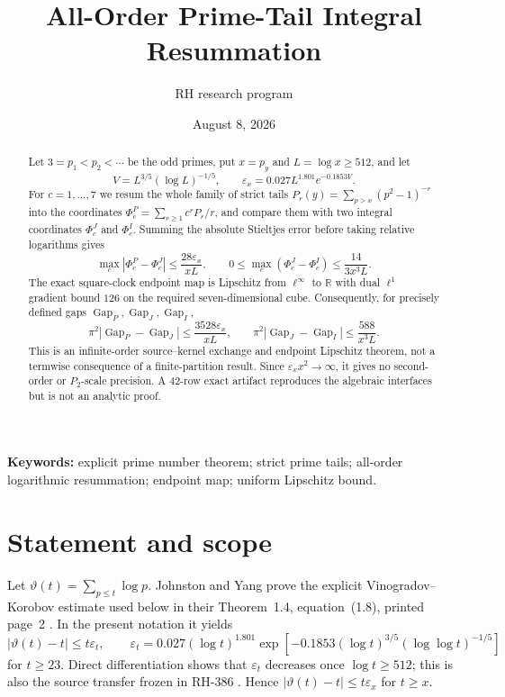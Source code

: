\documentclass[11pt]{article}
\title{All-Order Prime-Tail Integral Resummation}
\author{RH research program}
\date{August 8, 2026}
\theoremstyle{definition}
\theoremstyle{remark}
\newcommand{\eps}{\varepsilon}
\newcommand{\PhiP}{\Phi^{P}}
\newcommand{\PhiJ}{\Phi^{J}}
\newcommand{\PhiI}{\Phi^{I}}
\newcommand{\GapP}{\operatorname{Gap}_{P}}
\newcommand{\GapJ}{\operatorname{Gap}_{J}}
\newcommand{\GapI}{\operatorname{Gap}_{I}}
\begin{document}
\maketitle

\begin{abstract}
Let $3=p_1<p_2<\cdots$ be the odd primes, put $x=p_y$ and
$L=\log x\ge512$, and let
\[
 V=L^{3/5}(\log L)^{-1/5},\qquad
 \eps_x=0.027L^{1.801}e^{-0.1853V}.
\]
For $c=1,\ldots,7$ we resum the whole family of strict tails
$P_r(y)=\sum_{p>x}(p^2-1)^{-r}$ into the coordinates
$\PhiP_c=\sum_{r\ge1}c^rP_r/r$, and compare them with two integral
coordinates $\PhiJ_c$ and $\PhiI_c$.  Summing the absolute Stieltjes
error before taking relative logarithms gives
\[
 \max_c|\PhiP_c-\PhiJ_c|\le \frac{28\eps_x}{ xL},\qquad
 0\le\max_c(\PhiJ_c-\PhiI_c)\le \frac{14}{3x^3L}.
\]
The exact square-clock endpoint map is Lipschitz from $\ell^\infty$ to
$\mathbb R$ with dual $\ell^1$ gradient bound $126$ on the required
seven-dimensional cube.  Consequently, for precisely defined gaps
$\GapP,\GapJ,\GapI$,
\[
 \pi^2|\GapP-\GapJ|\le \frac{3528\eps_x}{ xL},\qquad
 \pi^2|\GapJ-\GapI|\le \frac{588}{ x^3L}.
\]
This is an infinite-order source--kernel exchange and endpoint Lipschitz
theorem, not a termwise consequence of a finite-partition result.  Since
$\eps_xx^2\to\infty$, it gives no second-order or $P_2$-scale precision.
A 42-row exact artifact reproduces the algebraic interfaces but is not an
analytic proof.
\end{abstract}

\noindent\textbf{Keywords:} explicit prime number theorem; strict prime
tails; all-order logarithmic resummation; endpoint map; uniform Lipschitz
bound.

\section{Statement and scope}

Let $\vartheta(t)=\sum_{p\le t}\log p$.  Johnston and Yang prove the
explicit Vinogradov--Korobov estimate used below in their Theorem~1.4,
equation~(1.8), printed page~2 \cite{JohnstonYang2023}.  In the present
notation it yields
\begin{equation}
 |\vartheta(t)-t|\le t\eps_t,\qquad
 \eps_t=0.027(\log t)^{1.801}
 \exp\!\left[-0.1853(\log t)^{3/5}(\log\log t)^{-1/5}\right]
 \label{eq:JY}
\end{equation}
for $t\ge23$.  Direct differentiation shows that $\eps_t$ decreases once
$\log t\ge512$; this is also the source transfer frozen in RH-386
\cite{RH386}.  Hence $|\vartheta(t)-t|\le t\eps_x$ for $t\ge x$.
\end{document}
